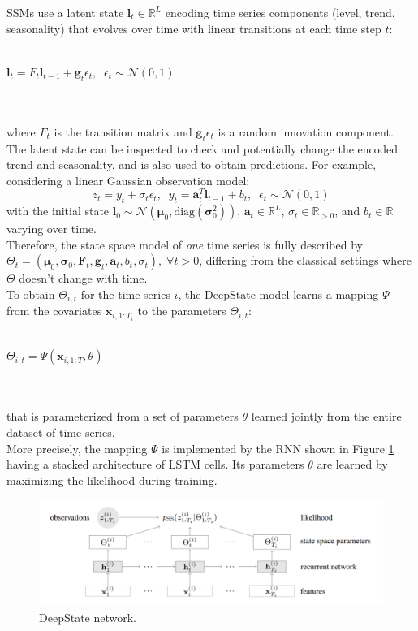\documentclass[a4paper, 12pt]{article} %
\begin{document}
	SSMs use a latent state $\pmb{l}_t \in \mathbb{R}^L$ encoding time series components (level, trend, seasonality) that evolves over time with linear transitions at each time step $t$:\\\\
	\centerline{
		$
		\pmb{l}_t = F_t \pmb{l}_{t-1} + \pmb{g }_t \epsilon_t, \;\; \epsilon_t \sim \mathcal{N}(0,1)
		$
	}\\\\
	where $F_t$ is the transition matrix and $\pmb{g }_t \epsilon_t$ is a random innovation component. The latent state can be inspected to check and potentially change the encoded trend and seasonality, and is also used to obtain predictions. For example, considering a linear Gaussian observation model:
	\begin{equation} \label{eq:deepstate}
		z_t = y_t + \sigma_t \epsilon_t, \;\; y_t = \pmb{a}_t^T \pmb{l}_{t-1} + b_t, \;\; \epsilon_t \sim \mathcal{N}(0,1)
	\end{equation}
	with the initial state $\pmb{l}_0 \sim \mathcal{N}(\pmb{\mu}_0, \text{diag}(\pmb{\sigma}_0^2))$, $\pmb{a}_t \in \mathbb{R}^L$, $\sigma_t \in \mathbb{R}_{>0}$, and $b_t \in \mathbb{R}$ varying over time. \\
	Therefore, the state space model of \textit{one} time series is fully described by $\Theta_t = (\pmb{\mu}_0, \pmb{\sigma}_0, \pmb{F}_t, \pmb{g}_ t, \pmb{a}_t, b_t, \sigma_t), \; \forall t > 0$, differing from the classical settings where $\Theta$ doesn't change with time.\\
	To obtain $\Theta_{i,t}$ for the time series $i$, the DeepState model learns a mapping $\Psi$ from the covariates $\pmb{x}_{i, 1:T_i}$ to the parameters $\Theta_{i, t}$:\\\\
	\centerline{
		$
		\Theta_{i,t} = \Psi(\pmb{x}_{i, 1:T}, \theta)
		$
	}\\\\
	that is parameterized from a set of parameters $\theta$ learned jointly from the entire dataset of time series. \\
	More precisely, the mapping $\Psi$ is implemented by the RNN shown in Figure \ref{fig:deepstate} having a stacked architecture of LSTM cells. Its parameters $\theta$ are learned by maximizing the likelihood during training.
	\begin{figure}
		\includegraphics[width=\linewidth]{img/deepstate.png}
		\caption{DeepState network.}
		\label{fig:deepstate}
	\end{figure}
	
\end{document}
